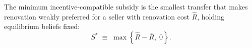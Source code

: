 \label{def:minimum_subsidy}
The minimum incentive-compatible subsidy is the smallest transfer that makes renovation weakly preferred for a seller with renovation cost $\hat R$, holding equilibrium beliefs fixed:
\begin{equation}
    S^*\;\equiv\;\max\!\left\{\hat{R}-\bar{R},\;0\right\}.
    \label{eq:subsidy}
\end{equation}
